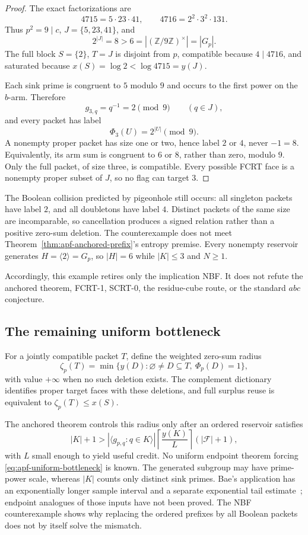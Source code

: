 \begin{proof}
The exact factorizations are
\[
 4715=5\cdot23\cdot41,
 \qquad
 4716=2^2\cdot3^2\cdot131.
\tag{APF-14}\label{eq:apf-4715-factorization}
\]
Thus $p^2=9\mid c$, $J=\{5,23,41\}$, and
\[
             2^{|J|}=8>6=|(\mathbb Z/9\mathbb Z)^\times|=|G_p|.
\]
The full block $S=\{2\}$, $T=J$ is disjoint from $p$, compatible because
$4\mid4716$, and saturated because $x(S)=\log2<\log4715=y(J)$.

Each sink prime is congruent to $5$ modulo $9$ and occurs to the first power
on the $b$-arm.  Therefore
\[
                         g_{3,q}=q^{-1}=2\pmod9
                         \qquad(q\in J),
\]
and every packet has label
\[
                         \Phi_3(U)=2^{|U|}\pmod9.
\]
A nonempty proper packet has size one or two, hence label $2$ or $4$, never
$-1=8$.  Equivalently, its arm sum is congruent to $6$ or $8$, rather than
zero, modulo $9$.  Only the full packet, of size three, is compatible.
Every possible FCRT face is a nonempty proper subset of $J$, so no flag can
target $3$.
\end{proof}

The Boolean collision predicted by pigeonhole still occurs: all singleton
packets have label $2$, and all doubletons have label $4$.  Distinct packets
of the same size are incomparable, so cancellation produces a signed
relation rather than a positive zero-sum deletion.  The counterexample does
not meet Theorem~\ref{thm:apf-anchored-prefix}'s entropy premise.  Every
nonempty reservoir generates $H=\langle2\rangle=G_p$, so $|H|=6$ while
$|K|\le3$ and $N\ge1$.

Accordingly, this example retires only the implication \textup{NBF}.  It
does not refute the anchored theorem, FCRT-1, SCRT-0, the residue-cube route,
or the standard $abc$ conjecture.

\subsection{The remaining uniform bottleneck}

For a jointly compatible packet $T$, define the weighted zero-sum radius
\[
 \zeta_p(T)=
 \min\{y(D):\varnothing\ne D\subseteq T,\ \Phi_p(D)=1\},
\tag{APF-15}\label{eq:apf-zero-sum-radius}
\]
with value $+\infty$ when no such deletion exists.  The complement dictionary
identifies proper target faces with these deletions, and full surplus reuse
is equivalent to $\zeta_p(T)\le x(S)$.

The anchored theorem controls this radius only after an ordered reservoir
satisfies
\[
 |K|+1>
 |\langle g_{p,q}:q\in K\rangle|
 \left\lceil\frac{y(K)}L\right\rceil
 (|\mathcal F|+1),
\tag{APF-16}\label{eq:apf-uniform-bottleneck}
\]
with $L$ small enough to yield useful credit.  No uniform endpoint theorem
forcing \eqref{eq:apf-uniform-bottleneck} is known.  The generated subgroup
may have prime-power scale, whereas $|K|$ counts only distinct sink primes.
Bae's application has an exponentially longer sample interval and a
separate exponential tail estimate~\cite{Bae2026Erdos684}; endpoint analogues
of those inputs have not been proved.  The NBF counterexample shows why
replacing the ordered prefixes by all Boolean packets does not by itself
solve the mismatch.

